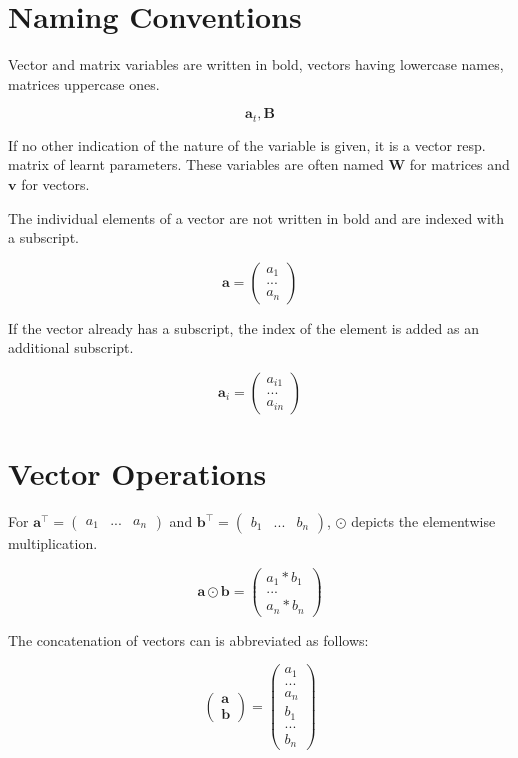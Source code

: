 \section{Naming Conventions}

Vector and matrix variables are written in bold, vectors having lowercase names, matrices uppercase ones.

\begin{equation*}
  \mathbf{a}_t, \mathbf{B}
\end{equation*}

If no other indication of the nature of the variable is given, it is a vector resp. matrix of learnt parameters. These variables are often named \(\mathbf{W}\) for matrices and \(\mathbf{v}\) for vectors.

\bigskip

The individual elements of a vector are not written in bold and are indexed with a subscript.

\begin{equation*}
  \mathbf{a} = \begin{pmatrix} a_1 \\ ... \\ a_n \end{pmatrix}
\end{equation*}

If the vector already has a subscript, the index of the element is added as an additional subscript.

\begin{equation*}
  \mathbf{a}_i = \begin{pmatrix} a_{i1} \\ ... \\ a_{in} \end{pmatrix}
\end{equation*}

\section{Vector Operations}

For \(\mathbf{a}^\intercal = \begin{pmatrix} a_1 & ... & a_n \end{pmatrix}\) and \(\mathbf{b}^\intercal = \begin{pmatrix} b_1 & ... & b_n \end{pmatrix}\), \(\odot\) depicts the elementwise multiplication.

\begin{equation*}
  \mathbf{a} \odot \mathbf{b} = \begin{pmatrix} a_1 * b_1 \\ ... \\ a_n * b_n \end{pmatrix}
\end{equation*}

The concatenation of vectors can is abbreviated as follows:

\begin{equation*}
  \begin{pmatrix} \mathbf{a} \\ \mathbf{b} \end{pmatrix} = \begin{pmatrix} a_1 \\ ... \\ a_n \\ b_1 \\ ... \\ b_n \end{pmatrix}
\end{equation*}
